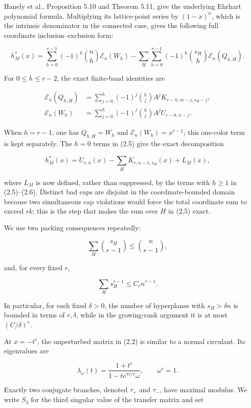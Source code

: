 \documentclass[10pt]{article}
\begin{document}
Hanely et al., Proposition 5.10 and Theorem 5.11, give the underlying Ehrhart
polynomial formula.  Multiplying its lattice-point series by $(1-x)^n$,
which is the intrinsic denominator in the connected case, gives the following
full coordinate inclusion--exclusion form:

\[
 h_M^*(x)=
 \sum_{h=0}^{r-1}(-1)^h\binom nh\mathcal E_n(W_h)
 -\sum_H\sum_{h=0}^{r-1}(-1)^h\binom{s_H}{h}
       \mathcal E_n(Q_{h,H}). \tag{2.5}
\]

For $0\le h\le r-2$, the exact finite-band identities are

\[
 \begin{aligned}
  \mathcal E_n(Q_{h,H})
    &=\sum_{j=0}^h(-1)^j\binom hj A^j
      K_{r-h,m-j,s_H-j},\\
  \mathcal E_n(W_h)
    &=\sum_{j=0}^h(-1)^j\binom hj A^j
      U_{r-h,n-j}.
 \end{aligned} \tag{2.6}
\]

When $h=r-1$, one has $Q_{h,H}=W_h$ and
$\mathcal E_n(W_h)=x^{r-1}$; this one-color term is kept separately.
The $h=0$ terms in (2.5) give the exact decomposition

\[
 h_M^*(x)=U_{r,n}(x)-\sum_HK_{r,n-1,s_H}(x)+L_M(x), \tag{2.7}
\]

where $L_M$ is now defined, rather than suppressed, by the terms with
$h\ge1$ in (2.5)--(2.6).  Distinct bad caps are disjoint in the
coordinate-bounded domain because two simultaneous cap violations would force
the total coordinate sum to exceed $rk$; this is the step that makes the sum
over $H$ in (2.5) exact.

We use two packing consequences repeatedly:

\[
 \sum_H\binom{s_H}{r-1}\le\binom n{r-1}, \tag{2.8}
\]

and, for every fixed $r$,

\[
 \sum_Hs_H^{r-1}\le C_r n^{r-1}. \tag{2.9}
\]

In particular, for each fixed $\delta>0$, the number of hyperplanes with
$s_H>\delta n$ is bounded in terms of $r,\delta$, while in the growing-rank
argument it is at most $(C/\delta)^r$.

At $x=-t^r$, the unperturbed matrix in (2.2) is similar to a normal
circulant.  Its eigenvalues are

\[
 \lambda_\omega(t)=\frac{1+t^r}{1-t e^{\pi i/r}\omega},
 \qquad \omega^r=1. \tag{2.10}
\]

Exactly two conjugate branches, denoted $\tau_+$ and $\tau_-$, have
maximal modulus.  We write $S_3$ for the third singular value of the
transfer matrix and set
\end{document}
